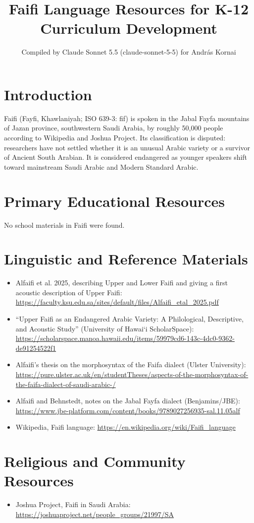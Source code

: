 \documentclass[12pt]{article}
\title{Faifi Language Resources for K-12 Curriculum Development}
\author{Compiled by Claude Sonnet 5.5 (claude-sonnet-5-5) for Andr\'as Kornai}
\date{}
\begin{document}
\maketitle

\section{Introduction}
Faifi (Fayfi, Khawlaniyah; ISO 639-3: fif) is spoken in the Jabal Fayfa mountains of Jazan province, southwestern Saudi Arabia, by roughly 50,000 people according to Wikipedia and Joshua Project. Its classification is disputed: researchers have not settled whether it is an unusual Arabic variety or a survivor of Ancient South Arabian. It is considered endangered as younger speakers shift toward mainstream Saudi Arabic and Modern Standard Arabic.

\section{Primary Educational Resources}
No school materials in Faifi were found.

\section{Linguistic and Reference Materials}
\begin{itemize}
\item Alfaifi et al. 2025, describing Upper and Lower Faifi and giving a first acoustic description of Upper Faifi: \url{https://faculty.ksu.edu.sa/sites/default/files/Alfaifi_etal_2025.pdf}
\item ``Upper Faifi as an Endangered Arabic Variety: A Philological, Descriptive, and Acoustic Study'' (University of Hawai`i ScholarSpace): \url{https://scholarspace.manoa.hawaii.edu/items/59979cd6-143c-4dc0-9362-de91254522f1}
\item Alfaifi's thesis on the morphosyntax of the Faifa dialect (Ulster University): \url{https://pure.ulster.ac.uk/en/studentTheses/aspects-of-the-morphosyntax-of-the-faifa-dialect-of-saudi-arabic-/}
\item Alfaifi and Behnstedt, notes on the Jabal Fayfa dialect (Benjamins/JBE): \url{https://www.jbe-platform.com/content/books/9789027256935-sal.11.05alf}
\item Wikipedia, Faifi language: \url{https://en.wikipedia.org/wiki/Faifi_language}
\end{itemize}

\section{Religious and Community Resources}
\begin{itemize}
\item Joshua Project, Faifi in Saudi Arabia: \url{https://joshuaproject.net/people_groups/21997/SA}
\end{itemize}
\end{document}

